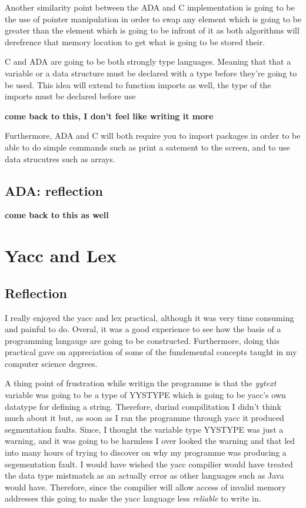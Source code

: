 \documentclass[
	12pt, %
]{fphw}
\begin{document}
Another similarity point between the ADA and C implementation is going to be the
use of pointer manipulation in order to swap any element which is going to be greater
than the element which is going to be infront of it as both algorithms will
derefrence that memory location to get what is going to be stored their.\par

C and ADA are going to be both strongly type languages. Meaning that that a variable
or a data structure must be declared with a type before they're going to be used.
This idea will extend to function imports as well, the type of the imports must be
declared before use

\textbf{come back to this, I don't feel like writing it more}

Furthermore, ADA and C will both require you to import packages in order to be able
to do simple commands such as print a satement to the screen, and to use data
strucutres such as arrays. \par

\subsection{ADA: reflection}
\textbf{come back to this as well}


\section{Yacc and Lex}


\subsection{Reflection}
I really enjoyed the yacc and lex practical, although it was very time consuming
and painful to do. Overal, it was a good experience to see how the basis of
a programming langauge are going to be constructed. Furthermore, doing this
practical gave on appreciation of some of the fundemental concepts taught in my
computer science degrees.\par

A thing point of frustration while writign the programme is that the \emph{yytext}
variable was going to be a type of YYSTYPE which is going to be yacc's own datatype
for defining a string. Therefore, durind compilitation I didn't think much about
it but, as soon as I ran the programme through yacc it produced segmentation faults.
Since, I thought the variable type YYSTYPE was just a warning, and it was
going to be harmless I over looked the warning and that led into many hours of
trying to discover on why my programme was producing a segementation fault. I
would have wished the yacc compilier would have treated the data type mistmatch
as an actually error as other languages such as Java would have. Therefore,
since the compilier will allow access of invalid memory addresses this going to
make the yacc language less \emph{reliable} to write in. \par
\end{document}
